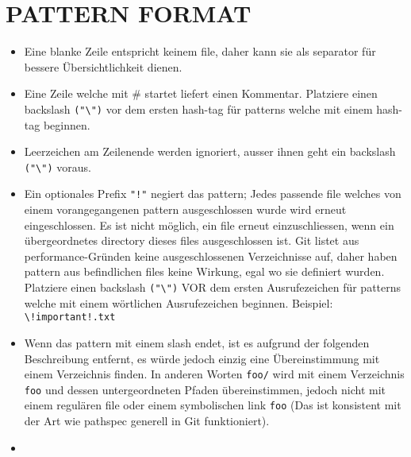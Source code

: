 \section*{PATTERN FORMAT}
\begin{itemize}
\item Eine blanke Zeile entspricht keinem file, daher kann sie als separator für bessere Übersichtlichkeit dienen.
\item Eine Zeile welche mit \# startet liefert einen Kommentar. Platziere einen backslash \verb|("\")| vor dem ersten hash-tag für patterns welche mit einem hash-tag beginnen.
\item Leerzeichen am Zeilenende werden ignoriert, ausser ihnen geht ein backslash \verb|("\")| voraus.
\item Ein optionales Prefix \verb|"!"| negiert das pattern; Jedes passende file welches von einem vorangegangenen pattern ausgeschlossen wurde wird erneut eingeschlossen. Es ist nicht möglich, ein file erneut einzuschliessen, wenn ein übergeordnetes directory dieses files ausgeschlossen ist. Git listet aus performance-Gründen keine ausgeschlossenen Verzeichnisse auf, daher haben pattern aus befindlichen files keine Wirkung, egal wo sie definiert wurden. Platziere einen backslash \verb|("\")| VOR dem ersten Ausrufezeichen für patterns welche mit einem wörtlichen Ausrufezeichen beginnen. Beispiel: \verb|\!important!.txt|
\item Wenn das pattern mit einem slash endet, ist es aufgrund der folgenden Beschreibung entfernt, es würde jedoch einzig eine Übereinstimmung mit einem Verzeichnis finden. In anderen Worten \verb|foo/| wird mit einem Verzeichnis \verb|foo| und dessen untergeordneten Pfaden übereinstimmen, jedoch nicht mit einem regulären file oder einem symbolischen link \verb|foo| (Das ist konsistent mit der Art wie pathspec generell in Git funktioniert).
\item 
\end{itemize}